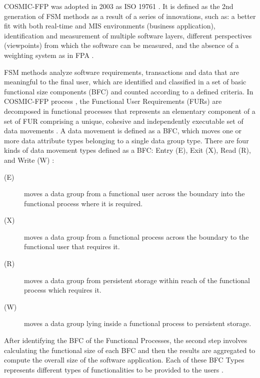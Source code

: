 \documentclass[conference]{IEEEtran}
\begin{document}
COSMIC-FFP \cite{COSMIC:2007} was adopted in 2003 as ISO 19761 \cite{ISO:2003}. It is defined as the 2nd generation of FSM methods as a result of a series of innovations, such as: a better fit with both real-time and MIS environments (business  application), identification and measurement of multiple software layers, different perspectives (viewpoints) from which the software can be measured, and the absence of a weighting system as in FPA \cite{GencelBuglione:2008}.

FSM methods analyze software requirements, transactions and data that are meaningful to the final user, which are identified and classified in a set of basic functional size components (BFC) and counted according to a defined criteria. In COSMIC-FFP process \cite{COSMIC:2007}, the Functional User Requirements (FURs) are decomposed in functional processes that represents an elementary component of a set of FUR comprising a unique, cohesive and independently executable set of data movements \cite{Gencel:2008}. A data movement is defined as a BFC, which moves one or more data attribute types belonging to a single data group type. There are four kinds of data movement types defined as a BFC: Entry (E), Exit (X), Read (R), and Write (W) \cite{COSMIC:2007}:

\begin{description}
  \item[(E)] moves a data group from a functional user across the boundary into the functional process where it is required.
  \item[(X)] moves a data group from a functional process across the boundary to the functional user that requires it.
  \item[(R)] moves a data group from persistent storage within reach of the functional process which requires it.
  \item[(W)] moves a data group lying inside a functional process to persistent storage.
\end{description}

After identifying the BFC of the Functional Processes, the second step involves calculating the functional size of each BFC and then the results are aggregated to compute the overall size of the software application. Each of these BFC Types represents different types of functionalities to be provided to the users \cite{Gencel:2008}.

\end{document}
